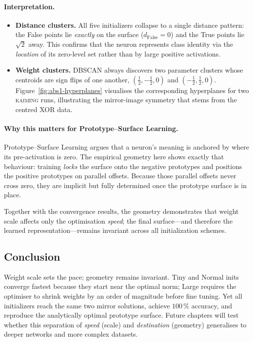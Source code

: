 \paragraph{Interpretation.}
\begin{itemize}
  \item \textbf{Distance clusters.}  
        All five initializers collapse to a single distance pattern:
        the False points lie \emph{exactly} on the surface
        ($d_{\text{False}}=0$) and the True points lie \(\sqrt2\) away.
        This confirms that the neuron represents class identity via the
        \emph{location} of its zero-level set rather than by large positive
        activations.
  \item \textbf{Weight clusters.}  
        DBSCAN always discovers two parameter clusters whose centroids are
        sign flips of one another,
        \((\frac12,-\frac12,0)\) and \((-\frac12,\frac12,0)\).
        Figure~\ref{fig:abs1-hyperplanes} visualises the corresponding
        hyperplanes for two \textsc{kaiming} runs, illustrating the
        mirror-image symmetry that stems from the centred XOR data.
\end{itemize}

\paragraph{Why this matters for Prototype–Surface Learning.}
Prototype–Surface Learning argues that a neuron’s meaning is anchored by
where its pre-activation is zero.  The empirical geometry here shows exactly
that behaviour: training \emph{locks} the surface onto the negative prototypes
and positions the positive prototypes on parallel offsets.  Because those
parallel offsets never cross zero, they are implicit but fully determined once
the prototype surface is in place.

Together with the convergence results, the geometry demonstrates that weight
scale affects only the optimisation \emph{speed}; the final surface—and
therefore the learned representation—remains invariant across all
initialization schemes.

\subsection*{Conclusion}

Weight scale sets the pace; geometry remains invariant.  Tiny and Normal
inits converge fastest because they start near the optimal norm; Large
requires the optimiser to shrink weights by an order of magnitude before fine
tuning.  Yet all initializers reach the same two mirror solutions, achieve
$100\,\%$ accuracy, and reproduce the analytically optimal prototype surface.
Future chapters will test whether this separation of \emph{speed} (scale) and
\emph{destination} (geometry) generalises to deeper networks and more complex
datasets.


